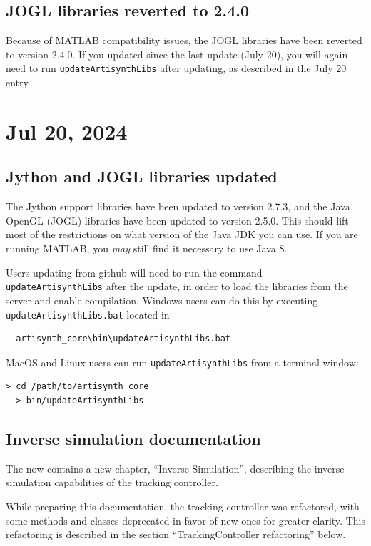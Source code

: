\documentclass{article}
\begin{document}
\subsection{JOGL libraries reverted to 2.4.0}

Because of MATLAB compatibility issues, the JOGL libraries have been reverted
to version 2.4.0. If you updated since the last update (July 20), you will again
need to run {\tt updateArtisynthLibs} after updating, as described in the July
20 entry.

\section*{Jul 20, 2024}

\subsection{Jython and JOGL libraries updated}

The Jython support libraries have been updated to version 2.7.3, and the Java
OpenGL (JOGL) libraries have been updated to version 2.5.0. This should lift
most of the restrictions on what version of the Java JDK you can use. If you
are running MATLAB, you {\it may} still find it necessary to use Java 8.

Users updating from github will need to run the command {\tt
updateArtisynthLibs} after the update, in order to load the libraries from the
server and enable compilation. Windows users can do this by executing {\tt
updateArtisynthLibs.bat} located in
%
\begin{verbatim}
  artisynth_core\bin\updateArtisynthLibs.bat
\end{verbatim}
%
MacOS and Linux users can run {\tt updateArtisynthLibs} from
a terminal window:
%
\begin{lstlisting}[]
  > cd /path/to/artisynth_core
  > bin/updateArtisynthLibs
\end{lstlisting}
%

\subsection{Inverse simulation documentation}

The  now contains a new chapter,
``Inverse Simulation'', describing the inverse simulation capabilities of the
tracking controller.

While preparing this documentation, the tracking controller was refactored,
with some methods and classes deprecated in favor of new ones for greater
clarity. This refactoring is described in the section ``TrackingController
refactoring'' below.
\end{document}
